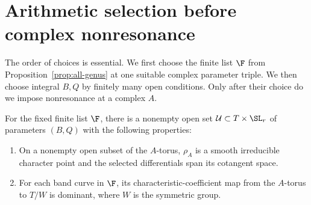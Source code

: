 \section{Arithmetic selection before complex nonresonance}\label{sec:selection}
The order of choices is essential. We first choose the finite list $\F$
from Proposition~\ref{prop:all-genus} at one suitable complex parameter
triple. We then choose integral $B,Q$ by finitely many open conditions.
Only after their choice do we impose nonresonance at a complex $A$.

\begin{lemma}\label{lem:finite-open}
For the fixed finite list $\F$, there is a nonempty open set
$\mathcal U\subset T\times\SL_r$ of parameters $(B,Q)$ with the following
properties:
\begin{enumerate}[label=(\roman*)]
\item On a nonempty open subset of the $A$-torus, $\rho_A$ is a smooth
irreducible character point and the selected differentials span its
cotangent space.
\item For each band curve in $\F$, its characteristic-coefficient map
from the $A$-torus to $T/W$ is dominant, where $W$ is the symmetric group.
\end{enumerate}
\end{lemma}

